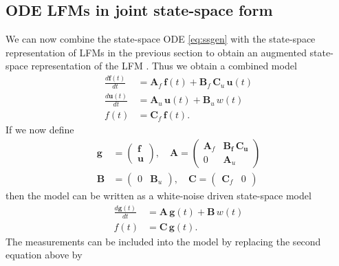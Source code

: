 \documentclass[journal]{IEEEtran}
\begin{document}
\subsection{ODE LFMs in joint state-space form}
%
We can now combine the  state-space ODE \eqref{eq:ssgen} with the state-space representation of LFMs in the previous section to obtain an augmented state-space representation of the LFM \cite{Hartikainen+Sarkka:2011,Hartikainen+Seppanen+Sarkka:2012}. Thus we obtain a combined model
%
\begin{equation}
\begin{split}
  \frac{d\mathbf{f}(t)}{dt}
  &= \mathbf{A}_f \, \mathbf{f}(t)
  + \mathbf{B}_f \, \mathbf{C}_u \, \mathbf{u}(t) \\
  \frac{d\mathbf{u}(t)}{dt}
  &= \mathbf{A}_u \, \mathbf{u}(t) + \mathbf{B}_u \, w(t) \\
  f(t) &= \mathbf{C}_f \, \mathbf{f}(t).
\end{split}
\label{eq:comb}
\end{equation}
%
If we now define
%
\begin{equation}
\begin{split}
  \mathbf{g} &= \begin{pmatrix}
	\mathbf{f} \\ \mathbf{u}
  \end{pmatrix}, \quad
  \mathbf{A}
  = \begin{pmatrix}
	\mathbf{A}_f & \mathbf{\mathbf{B}_f \, \mathbf{C}_u} \\
	0 & \mathbf{A}_u
  \end{pmatrix} \\
  \mathbf{B}
  &= \begin{pmatrix}
	0 & \mathbf{B}_u
  \end{pmatrix}, \quad
  \mathbf{C}
  = \begin{pmatrix}
	\mathbf{C}_f & 0
  \end{pmatrix}
\end{split}
\label{eq:ssaugmats}
\end{equation}
%
then the model can be written as a white-noise driven state-space model
%
\begin{equation}
\begin{split}
  \frac{d\mathbf{g}(t)}{dt}
  &= \mathbf{A} \, \mathbf{g}(t)
  + \mathbf{B} \, w(t) \\
  f(t) &= \mathbf{C} \, \mathbf{g}(t).
\end{split}
\label{eq:ssaug}
\end{equation}
%
The measurements can be included into the model by replacing the second equation above by
\end{document}
